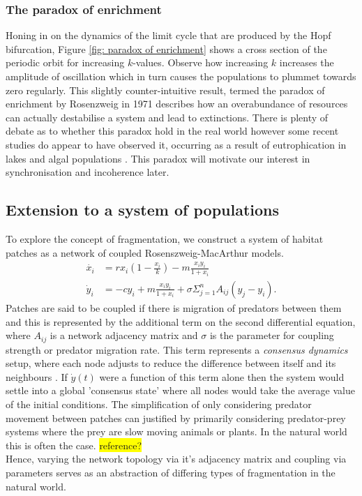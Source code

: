 \documentclass[12pt]{article}
\begin{document}
\subsubsection{The paradox of enrichment}\label{section: paradox of enrichment}
Honing in on the dynamics of the limit cycle that are produced by the Hopf bifurcation, Figure \ref{fig: paradox of enrichment} shows a cross section of the periodic orbit for increasing $k$-values. Observe how increasing $k$ increases the amplitude of oscillation which in turn causes the populations to plummet towards zero regularly. This slightly counter-intuitive result, termed the paradox of enrichment by Rosenzweig in 1971 \cite{gilpin1972enriched} describes how an overabundance of resources can actually destabilise a system and lead to extinctions. There is plenty of debate as to whether this paradox hold in the real world \cite{jensen2005paradoxes} however some recent studies do appear to have observed it, occurring as a result of eutrophication in lakes and algal populations \cite{cottingham2000increased, jensen2005paradoxes}. This paradox will motivate our interest in synchronisation and incoherence later.

\subsection{Extension to a system of populations}\label{section: extension to system of populations}
To explore the concept of fragmentation, we construct a system of habitat patches as a network of coupled Rosenszweig-MacArthur models.
\begin{align}
    \dot{x_i} &= r x_i (1 - \frac{x_i}{k}) - m \frac{x_i y_i}{1+x_i} \\
    \dot{y}_i &= -c y_i + m \frac{x_i y_i}{1 + x_i} + \sigma \Sigma_{j=1}^nA_{ij}(y_j - y_i).
  \end{align}\label{fig: RMT system}
\noindent
Patches are said to be coupled if there is migration of predators between them and this is represented by the additional term on the second differential equation, where $A_{ij}$ is a network adjacency matrix and $\sigma$ is the parameter for coupling strength or predator migration rate. This term represents a \textit{consensus dynamics} setup, where each node adjusts to reduce the difference between itself and its neighbours \cite{lambiottenotes}. If $\dot{y}(t)$ were a function of this term alone then the system would settle into a global 'consensus state' where all nodes would take the average value of the initial conditions.
The simplification of only considering predator movement between patches can justified by primarily considering predator-prey systems where the prey are slow moving animals or plants. In the natural world this is often the case. \colorbox{yellow}{reference?} \\
Hence, varying the network topology via it's adjacency matrix and coupling via parameters serves as an abstraction of differing types of fragmentation in the natural world. \\
\end{document}
